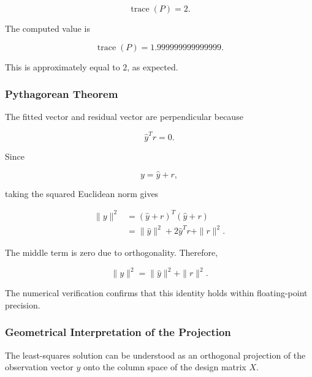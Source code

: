 \documentclass[12pt,a4paper]{article}
\numberwithin{equation}{section}
\begin{document}
\begin{equation}
\boxed{\operatorname{trace}(P)=2}.
\end{equation}

The computed value is

\begin{equation}
\operatorname{trace}(P)=1.999999999999999.
\end{equation}

This is approximately equal to $2$, as expected.

\subsubsection{Pythagorean Theorem}

The fitted vector and residual vector are
perpendicular because

\begin{equation}
\hat{y}^Tr=0.
\end{equation}

Since

\begin{equation}
y=\hat{y}+r,
\end{equation}

taking the squared Euclidean norm gives

\begin{equation}
\begin{aligned}
\|y\|^2
&=(\hat{y}+r)^T
(\hat{y}+r)\\
&=\|\hat{y}\|^2
+2\hat{y}^Tr+\|r\|^2.
\end{aligned}
\end{equation}

The middle term is zero due to orthogonality.
Therefore,

\begin{equation}
\boxed{
\|y\|^2=
\|\hat{y}\|^2+\|r\|^2
}.
\end{equation}

The numerical verification confirms that this
identity holds within floating-point precision.

\subsubsection{Geometrical Interpretation of the Projection}

The least-squares solution can be understood
as an orthogonal projection of the observation
vector $y$ onto the column space of the design
matrix $X$.
\end{document}
